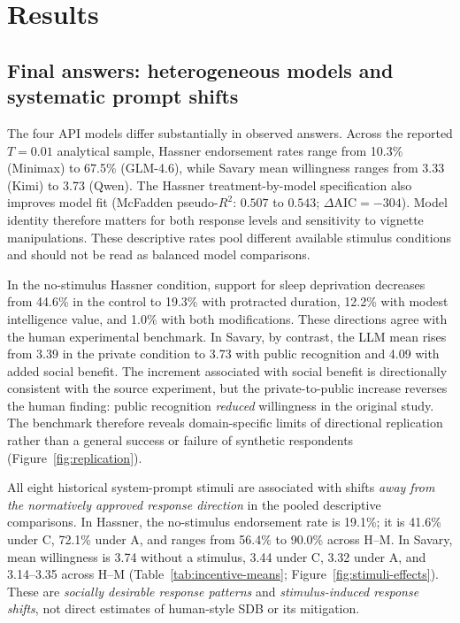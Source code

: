\section{Results}

\subsection{Final answers: heterogeneous models and systematic prompt shifts}

The four API models differ substantially in observed answers. Across the reported $T=0.01$ analytical sample, Hassner endorsement rates range from 10.3\% (Minimax) to 67.5\% (GLM-4.6), while Savary mean willingness ranges from 3.33 (Kimi) to 3.73 (Qwen). The Hassner treatment-by-model specification also improves model fit (McFadden pseudo-$R^2$: $0.507$ to $0.543$; $\Delta\mathrm{AIC}=-304$). Model identity therefore matters for both response levels and sensitivity to vignette manipulations. These descriptive rates pool different available stimulus conditions and should not be read as balanced model comparisons.

In the no-stimulus Hassner condition, support for sleep deprivation decreases from 44.6\% in the control to 19.3\% with protracted duration, 12.2\% with modest intelligence value, and 1.0\% with both modifications. These directions agree with the human experimental benchmark. In Savary, by contrast, the LLM mean rises from 3.39 in the private condition to 3.73 with public recognition and 4.09 with added social benefit. The increment associated with social benefit is directionally consistent with the source experiment, but the private-to-public increase reverses the human finding: public recognition \emph{reduced} willingness in the original study. The benchmark therefore reveals domain-specific limits of directional replication rather than a general success or failure of synthetic respondents (Figure~\ref{fig:replication}).

All eight historical system-prompt stimuli are associated with shifts \emph{away from the normatively approved response direction} in the pooled descriptive comparisons. In Hassner, the no-stimulus endorsement rate is 19.1\%; it is 41.6\% under C, 72.1\% under A, and ranges from 56.4\% to 90.0\% across H--M. In Savary, mean willingness is 3.74 without a stimulus, 3.44 under C, 3.32 under A, and 3.14--3.35 across H--M (Table~\ref{tab:incentive-means}; Figure~\ref{fig:stimuli-effects}). These are \emph{socially desirable response patterns} and \emph{stimulus-induced response shifts}, not direct estimates of human-style SDB or its mitigation.


